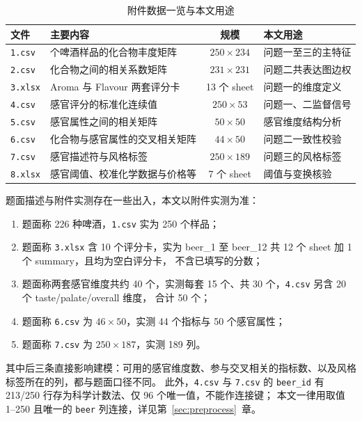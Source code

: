﻿\documentclass[UTF8,a4paper,zihao=-4]{ctexart}
\numberwithin{figure}{section}
\numberwithin{table}{section}
\numberwithin{equation}{section}
\newcommand{\file}[1]{\texttt{#1}}
\begin{document}
\begin{table}[H]
  \centering
  \caption{附件数据一览与本文用途}
  \label{tab:data}
  \small
  \begin{tabularx}{\textwidth}{@{}l >{\hsize=1.2\hsize}X c >{\hsize=0.8\hsize}X@{}}
    \toprule
    文件 & 主要内容 & 规模 & 本文用途 \\
    \midrule
    \file{1.csv} & 250 个啤酒样品的化合物丰度矩阵 & $250\!\times\!234$ & 问题一至三的主特征 \\
    \file{2.csv} & 化合物之间的相关系数矩阵 & $231\!\times\!231$ & 问题二共表达图边权 \\
    \file{3.xlsx} & Aroma 与 Flavour 两套评分卡 & 13 个 sheet & 问题一的维度定义 \\
    \file{4.csv} & 感官评分的标准化连续值 & $250\!\times\!53$ & 问题一、二监督信号 \\
    \file{5.csv} & 感官属性之间的相关矩阵 & $50\!\times\!50$ & 感官维度结构分析 \\
    \file{6.csv} & 化合物与感官属性的交叉相关矩阵 & $44\!\times\!50$ & 问题二一致性校验 \\
    \file{7.csv} & 感官描述符与风格标签 & $250\!\times\!189$ & 问题三的风格标签 \\
    \file{8.xlsx} & 感官阈值、校准化学数据与价格等 & 7 个 sheet & 阈值与变换核验 \\
    \bottomrule
  \end{tabularx}
\end{table}

题面描述与附件实测存在一些出入，本文以附件实测为准：

\begin{enumerate}[label=（\arabic*）,leftmargin=2.5em,itemsep=0pt,topsep=2pt,parsep=0pt]
  \item 题面称 226 种啤酒，\file{1.csv} 实为 250 个样品；
  \item 题面称 \file{3.xlsx} 含 10 个评分卡，实为 beer\_1 至 beer\_12 共 12 个 sheet 加 1 个 summary，且均为空白评分卡，
  不含已填写的分数；
  \item 题面称两套感官维度共约 40 个，实测每套 15 个、共 30 个，\file{4.csv} 另含 20 个 taste/palate/overall 维度，
  合计 50 个；
  \item 题面称 \file{6.csv} 为 $46\!\times\!50$，实测 44 个指标与 50 个感官属性；
  \item 题面称 \file{7.csv} 为 $250\!\times\!187$，实测 189 列。
\end{enumerate}

其中后三条直接影响建模：可用的感官维度数、参与交叉相关的指标数、以及风格标签所在的列，都与题面口径不同。
此外，\file{4.csv} 与 \file{7.csv} 的 \file{beer\_id} 有 213/250 行存为科学计数法、仅 96 个唯一值，不能作连接键；
本文一律用取值 1--250 且唯一的 \file{beer} 列连接，详见第~\ref{sec:preprocess}~章。
\end{document}

